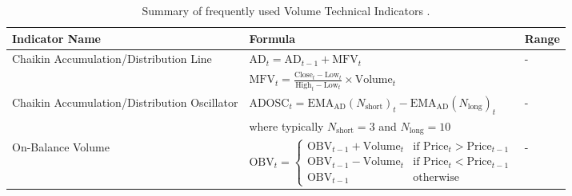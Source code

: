 \begin{table}[htb!]
\centering
\footnotesize
\begin{tabularx}{\textwidth}{@{}lXl@{}}
\toprule
\textbf{Indicator Name} & \textbf{Formula} & \textbf{Range} \\ 
\midrule
Chaikin Accumulation/Distribution Line & $\text{AD}_t = \text{AD}_{t-1} + \text{MFV}_t$ & - \\
\addlinespace
& $\text{MFV}_t = \frac{\text{Close}_t - \text{Low}_t}{\text{High}_t - \text{Low}_t} \times \text{Volume}_t$ & \\
\addlinespace
Chaikin Accumulation/Distribution Oscillator & $\text{ADOSC}_t = \text{EMA}_\text{AD}(N_{\text{short}})_t - \text{EMA}_\text{AD}(N_{\text{long}})_t$ & - \\
\addlinespace
& where typically $N_{\text{short}} = 3$ and $N_{\text{long}} = 10$ & \\
\addlinespace
On-Balance Volume & $\text{OBV}_t = 
\begin{cases} 
\text{OBV}_{t-1} + \text{Volume}_t & \text{if } \text{Price}_t > \text{Price}_{t-1} \\
\text{OBV}_{t-1} - \text{Volume}_t & \text{if } \text{Price}_t < \text{Price}_{t-1} \\
\text{OBV}_{t-1} & \text{otherwise}
\end{cases}$ & - \\
\bottomrule
\end{tabularx}
\caption{Summary of frequently used Volume Technical Indicators \cite{jansen_machine_2020}.}
\label{Tables:VolumeIndicators}
\end{table}
